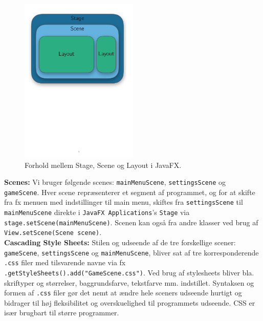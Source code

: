 \begin{figure}[H]
\centering
\includegraphics[width = 0.5\textwidth]{Figurer/GUI.pdf}
\caption{Forhold mellem Stage, Scene og Layout i JavaFX.}
\label{fig:GUI}
\end{figure}

\textbf{Scenes:} 
Vi bruger følgende scenes: \texttt{mainMenuScene}, \texttt{settingsScene} og \texttt{gameScene}. Hver scene repræsenterer et segment af programmet, og for at skifte fra fx menuen med indstillinger til main menu, skiftes fra \texttt{settingsScene} til \texttt{mainMenuScene} direkte i \texttt{JavaFX Applications}'s \texttt{Stage} via \texttt{stage.setScene(mainMenuScene)}. Scenen kan også fra andre klasser ved brug af \texttt{View.setScene(Scene scene)}.\\

\textbf{Cascading Style Sheets:} Stilen og udseende af de tre forskellige scener: \texttt{gameScene}, \texttt{settingsScene} og \texttt{mainMenuScene}, bliver sat af tre korresponderende \texttt{.css} filer med tilsvarende navne via fx \texttt{.getStyleSheets().add("GameScene.css")}. Ved brug af stylesheets bliver bla. skriftyper og størrelser, baggrundsfarve, tekstfarve mm. indstillet. Syntaksen og formen af \texttt{.css} filer gør det nemt at ændre hele sceners udseende hurtigt og bidrager til høj fleksibilitet og overskuelighed til programmets udseende. CSS er især brugbart til større programmer.\\

